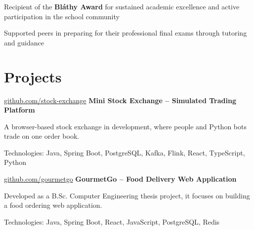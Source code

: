 \documentclass[]{deedy-resume-reversed}
\begin{document}
    \vspace{0.10 cm}
    \begin{onecolentry}
        \begin{highlights}
            \item Recipient of the \textbf{Bláthy Award} for sustained academic excellence and active participation in the school community
            \item Supported peers in preparing for their professional final exams through tutoring and guidance
        \end{highlights}
    \end{onecolentry}


\section{Projects}
\vspace{0.1 cm}

 \begin{twocolentry}{
     \href{https://github.com/Princz-Mia/mini-stock-exchange}{github.com/stock-exchange}
 }
     \textbf{Mini Stock Exchange -- Simulated Trading Platform}\end{twocolentry}

 \vspace{0.05 cm}
 \begin{onecolentry}
     \begin{highlights}
         \item A browser-based stock exchange in development, where people and Python bots trade on one order book.
         \item Technologies: Java, Spring Boot, PostgreSQL, Kafka, Flink, React, TypeScript, Python
    \end{highlights}
\end{onecolentry}

 \vspace{0.2 cm}

 \begin{twocolentry}{
     \href{https://github.com/Princz-Mia/viaual04-gourmetgo}{github.com/gourmetgo}
 }
     \textbf{GourmetGo -- Food Delivery Web Application}\end{twocolentry}

 \vspace{0.05 cm}
 \begin{onecolentry}
     \begin{highlights}
         \item Developed as a B.Sc. Computer Engineering thesis project, it focuses on building a food ordering web application.
         \item Technologies: Java, Spring Boot, React, JavaScript, PostgreSQL, Redis
    \end{highlights}
\end{onecolentry}
\end{document}
